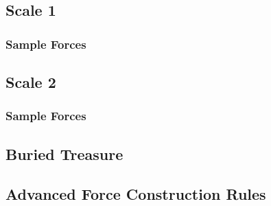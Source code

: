 

\subsection{Scale 1}
\label{subsec:force_construction_scale_1}



\subsubsection{Sample Forces}
\label{subsec:sample_commands_scale_1}



\newpage

\subsection{Scale 2}
\label{subsec:force_construction_scale_2}



\subsubsection{Sample Forces}
\label{subsec:sample_commands_scale_2}



\newpage

\subsection{Buried Treasure}



\newpage

\subsection{Advanced Force Construction Rules}





\newpage
